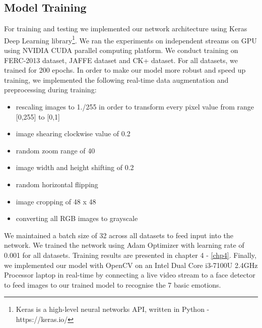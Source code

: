 \documentclass[master]{thesis-uestc}
\begin{document}
\subsection{Model Training}
For training and testing we implemented our network architecture using Keras Deep Learning library\footnote{Keras is a high-level neural networks API, written in Python - https://keras.io/}. We ran the experiments on independent streams on GPU using NVIDIA CUDA parallel computing platform. We conduct training on FERC-2013 dataset, JAFFE dataset and CK+ dataset. For all datasets, we trained for 200 epochs. In order to make our model more robust and speed up training, we implemented the following real-time data augmentation and preprocessing during training:
\begin{itemize}
 \item rescaling images to 1./255 in order to transform every pixel value from range [0,255] to [0,1]
 \item image shearing clockwise value of 0.2
 \item  random zoom range of 40
 \item  image width and height shifting of 0.2
 \item random horizontal flipping
 \item image cropping of 48 x 48
 \item converting all RGB images to grayscale
\end{itemize}
We maintained a batch size of 32 across all datasets to feed input into the network. We trained the network using Adam Optimizer  with learning rate of 0.001 for all datasets. Training results are presented in chapter 4 - \ref{chp4}. Finally, we implemented our model with OpenCV on an Intel Dual Core i3-7100U 2.4GHz Processor laptop in real-time by connecting a live video stream to a face detector to feed images to our trained model to recognise the 7 basic emotions.
\end{document}
